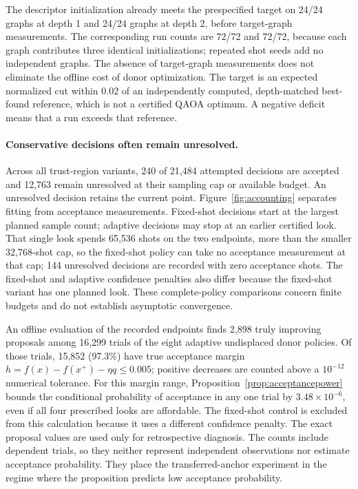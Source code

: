 The descriptor initialization already meets the prespecified target on 24/24 graphs at depth 1 and 24/24 graphs at depth 2, before target-graph measurements. The corresponding run counts are 72/72 and 72/72, because each graph contributes three identical initializations; repeated shot seeds add no independent graphs. The absence of target-graph measurements does not eliminate the offline cost of donor optimization. The target is an expected normalized cut within 0.02 of an independently computed, depth-matched best-found reference, which is not a certified QAOA optimum. A negative deficit means that a run exceeds that reference.
\paragraph{Conservative decisions often remain unresolved.}
Across all trust-region variants, 240 of 21,484 attempted decisions are accepted and 12,763 remain unresolved at their sampling cap or available budget. An unresolved decision retains the current point. Figure~\ref{fig:accounting} separates fitting from acceptance measurements. Fixed-shot decisions start at the largest planned sample count; adaptive decisions may stop at an earlier certified look. That single look spends 65,536 shots on the two endpoints, more than the smaller 32,768-shot cap, so the fixed-shot policy can take no acceptance measurement at that cap; 144 unresolved decisions are recorded with zero acceptance shots. The fixed-shot and adaptive confidence penalties also differ because the fixed-shot variant has one planned look. These complete-policy comparisons concern finite budgets and do not establish asymptotic convergence.

An offline evaluation of the recorded endpoints finds 2,898 truly improving proposals among 16,299 trials of the eight adaptive undisplaced donor policies. Of those trials, 15,852 (97.3\%) have true acceptance margin $h=f(x)-f(x^+)-\eta q\leq0.005$; positive decreases are counted above a $10^{-12}$ numerical tolerance. For this margin range, Proposition~\ref{prop:acceptancepower} bounds the conditional probability of acceptance in any one trial by $3.48\times10^{-6}$, even if all four prescribed looks are affordable. The fixed-shot control is excluded from this calculation because it uses a different confidence penalty. The exact proposal values are used only for retrospective diagnosis. The counts include dependent trials, so they neither represent independent observations nor estimate acceptance probability. They place the transferred-anchor experiment in the regime where the proposition predicts low acceptance probability.

